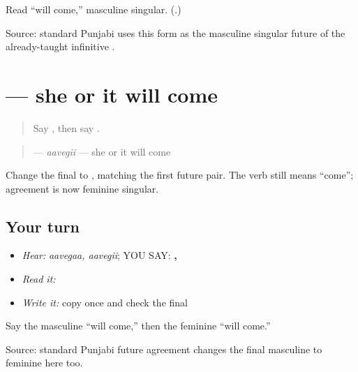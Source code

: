 \begin{tcolorbox}[breakable,colback=teal!4,colframe=teal!35!black,title={Before you move on}]
Read “will come,” masculine singular. (\textbf{}.)

Source: standard Punjabi uses this form as the masculine singular future of the already-taught infinitive \textbf{}.
\end{tcolorbox}
\section[\texorpdfstring{\pa{ਆਵੇਗੀ} (aavegii)}{ਆਵੇਗੀ (aavegii)}]{ — she or it will come}

\label{lesson:PA-C186-aavegi}



\begin{quote}
Say \textbf{}, then say \textbf{}.
\end{quote}

\begin{grammarlens}[title={Grammar Lens: transfer the feminine future}]
\begin{quote}
\textbf{} — \emph{aavegii} — she or it will come
\end{quote}

Change the final \textbf{} to \textbf{}, matching the first future pair. The verb still means “come”; agreement is now feminine singular.
\end{grammarlens}

\subsection*{Your turn}
\begin{itemize}
\raggedright
  \item \emph{Hear:} \emph{aavegaa, aavegii}; YOU SAY: \textbf{, }
  \item \emph{Read it:} \textbf{ }
  \item \emph{Write it:} copy \textbf{} once and check the final \textbf{}
\end{itemize}

\begin{tcolorbox}[breakable,colback=teal!4,colframe=teal!35!black,title={Before you move on}]
Say the masculine “will come,” then the feminine “will come.”

Source: standard Punjabi future agreement changes the final masculine \textbf{} to feminine \textbf{} here too.
\end{tcolorbox}
